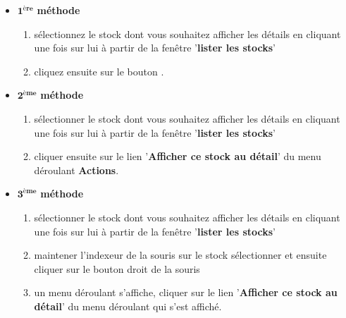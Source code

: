 \begin{itemize}[]
	\item \textcolor{purplish}{$\mathbf{1^{\text{\`ere}}}$ \textbf{m\'ethode}}
		\begin{enumerate}[1)]
			\item s\'electionnez le stock dont vous souhaitez
			afficher les d\'etails en cliquant une fois sur lui
			\` a partir de la fen\^etre '\textbf{lister les stocks}'
			
			\item cliquez ensuite sur le bouton .	\\
		\end{enumerate}
	
	\item \textcolor{purplish}{$\mathbf{2^{\text{\`eme}}}$ \textbf{m\'ethode}}
		\begin{enumerate}[1)]
			\item s\'electionner le stock dont vous souhaitez
			afficher les d\'etails en cliquant une fois sur lui
			\` a partir de la fen\^etre '\textbf{lister les stocks}'
			
			\item cliquer ensuite sur le lien '\textbf{Afficher ce stock au d\'etail}'
			du menu d\'eroulant \textbf{Actions}.\\
		\end{enumerate}
	
	\item \textcolor{purplish}{$\mathbf{3^{\text{\`eme}}}$ \textbf{m\'ethode}}
		\begin{enumerate}[1)]
			\item s\'electionner le stock dont vous souhaitez
			afficher les d\'etails en cliquant une fois sur lui
			\` a partir de la fen\^etre '\textbf{lister les stocks}'
			
			\item maintener l'indexeur de la souris sur le stock
				s\'electionner et ensuite cliquer sur le bouton
				droit de la souris
			
			\item un menu d\'eroulant s'affiche, cliquer sur
				le lien '\textbf{Afficher ce stock au d\'etail}' du
				menu d\'eroulant qui s'est affich\'e. 
		\end{enumerate}
\end{itemize}

\newpage
{}



